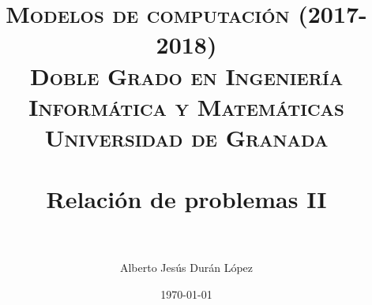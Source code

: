 


\title{	
\normalfont \normalsize 
\textsc{\textbf{Modelos de computación (2017-2018)} \\ Doble Grado en Ingeniería Informática y Matemáticas \\ Universidad de Granada} \\ [25pt] %
\horrule{0.5pt} \\[0.4cm] %
\huge Relación de problemas II \\ %
\horrule{2pt} \\[0.5cm] %
}

\author{Alberto Jesús Durán López} %

\date{\normalsize\today} %




\maketitle %

\newpage %

\tableofcontents %



\newpage













